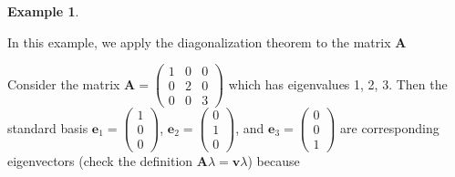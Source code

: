 \documentclass[
]{book}
\theoremstyle{definition}
\theoremstyle{definition}
\newtheorem{example}{Example}[chapter]
\theoremstyle{definition}
\theoremstyle{remark}
\begin{document}
\begin{example}
\protect\hypertarget{exm:unlabeled-div-183}{}\label{exm:unlabeled-div-183}

In this example, we apply the diagonalization theorem to the matrix \(\mathbf{A}\)

Consider the matrix \(\mathbf{A} = \begin{pmatrix} 1 & 0 & 0 \\ 0 & 2 & 0 \\ 0 & 0 & 3 \end{pmatrix}\) which has eigenvalues 1, 2, 3. Then the standard basis \(\mathbf{e}_1 = \begin{pmatrix} 1 \\ 0 \\ 0 \end{pmatrix}\), \(\mathbf{e}_2 = \begin{pmatrix} 0 \\ 1 \\ 0 \end{pmatrix}\), and \(\mathbf{e}_3 = \begin{pmatrix} 0 \\ 0 \\ 1 \end{pmatrix}\) are corresponding eigenvectors (check the definition \(\mathbf{A} \lambda = \mathbf{v} \lambda\)) because


\end{example}
\end{document}
